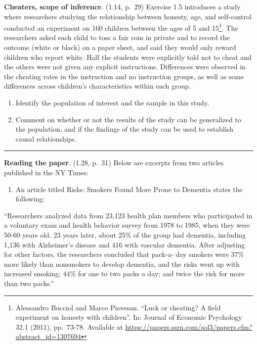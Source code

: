 \documentclass[
]{article}
\providecommand{\tightlist}{%
  \setlength{\itemsep}{0pt}\setlength{\parskip}{0pt}}
\begin{document}
\textbf{Cheaters, scope of inference}. (1.14, p.~29) Exercise 1.5
introduces a study where researchers studying the relationship between
honesty, age, and self-control conducted an experiment on 160 children
between the ages of 5 and 15\footnote{Alessandro Bucciol and Marco
  Piovesan. ``Luck or cheating? A field experiment on honesty with
  children''. In: Journal of Economic Psychology 32.1 (2011), pp.~73-78.
  Available at
  \url{https://papers.ssrn.com/sol3/papers.cfm?abstract_id=1307694}}.
The researchers asked each child to toss a fair coin in private and to
record the outcome (white or black) on a paper sheet, and said they
would only reward children who report white. Half the students were
explicitly told not to cheat and the others were not given any explicit
instructions. Differences were observed in the cheating rates in the
instruction and no instruction groups, as well as some differences
across children's characteristics within each group.

\begin{enumerate}
\def\labelenumi{(\alph{enumi})}
\tightlist
\item
  Identify the population of interest and the sample in this study.
\item
  Comment on whether or not the results of the study can be generalized
  to the population, and if the findings of the study can be used to
  establish causal relationships.
\end{enumerate}

\begin{center}\rule{0.5\linewidth}{0.5pt}\end{center}

\clearpage

\textbf{Reading the paper}. (1.28, p.~31) Below are excerpts from two
articles published in the NY Times:

\begin{enumerate}
\def\labelenumi{(\alph{enumi})}
\tightlist
\item
  An article titled Risks: Smokers Found More Prone to Dementia states
  the following:
\end{enumerate}

``Researchers analyzed data from 23,123 health plan members who
participated in a voluntary exam and health behavior survey from 1978 to
1985, when they were 50-60 years old. 23 years later, about 25\% of the
group had dementia, including 1,136 with Alzheimer's disease and 416
with vascular dementia. After adjusting for other factors, the
researchers concluded that pack-a- day smokers were 37\% more likely
than nonsmokers to develop dementia, and the risks went up with
increased smoking; 44\% for one to two packs a day; and twice the risk
for more than two packs.''
\end{document}
